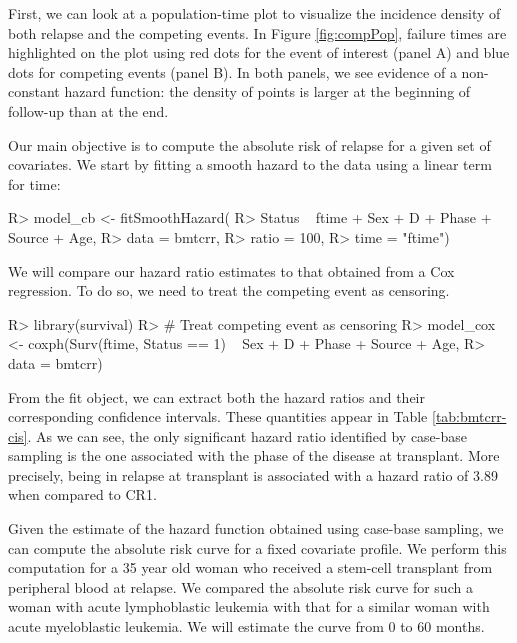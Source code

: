 \documentclass[
]{jss}
\begin{document}
First, we can look at a population-time plot to visualize the incidence
density of both relapse and the competing events. In Figure
\ref{fig:compPop}, failure times are highlighted on the plot using red
dots for the event of interest (panel A) and blue dots for competing
events (panel B). In both panels, we see evidence of a non-constant
hazard function: the density of points is larger at the beginning of
follow-up than at the end.

Our main objective is to compute the absolute risk of relapse for a
given set of covariates. We start by fitting a smooth hazard to the data
using a linear term for time:

\begin{CodeChunk}

\begin{CodeInput}
R> model_cb <- fitSmoothHazard(
R>     Status ~ ftime + Sex + D + Phase + Source + Age, 
R>     data = bmtcrr, 
R>     ratio = 100, 
R>     time = "ftime")
\end{CodeInput}
\end{CodeChunk}

We will compare our hazard ratio estimates to that obtained from a Cox
regression. To do so, we need to treat the competing event as censoring.

\begin{CodeChunk}

\begin{CodeInput}
R> library(survival)
R> # Treat competing event as censoring
R> model_cox <- coxph(Surv(ftime, Status == 1) ~ Sex + D + Phase + Source + Age,
R>                    data = bmtcrr)
\end{CodeInput}
\end{CodeChunk}

From the fit object, we can extract both the hazard ratios and their
corresponding confidence intervals. These quantities appear in Table
\ref{tab:bmtcrr-cis}. As we can see, the only significant hazard ratio
identified by case-base sampling is the one associated with the phase of
the disease at transplant. More precisely, being in relapse at
transplant is associated with a hazard ratio of 3.89 when compared to
CR1.

Given the estimate of the hazard function obtained using case-base
sampling, we can compute the absolute risk curve for a fixed covariate
profile. We perform this computation for a 35 year old woman who
received a stem-cell transplant from peripheral blood at relapse. We
compared the absolute risk curve for such a woman with acute
lymphoblastic leukemia with that for a similar woman with acute
myeloblastic leukemia. We will estimate the curve from 0 to 60 months.
\end{document}
